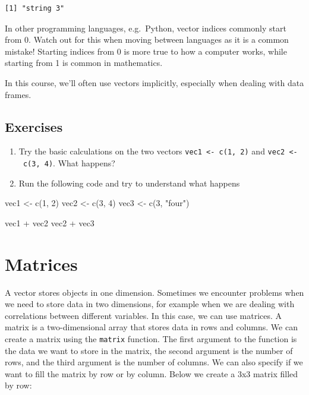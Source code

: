 \documentclass[
  letterpaper,
  DIV=11,
  numbers=noendperiod]{scrreprt}
\newenvironment{Shaded}{\begin{snugshade}}{\end{snugshade}}
\newcommand{\AttributeTok}[1]{\textcolor[rgb]{0.40,0.45,0.13}{#1}}
\newcommand{\DecValTok}[1]{\textcolor[rgb]{0.68,0.00,0.00}{#1}}
\newcommand{\FunctionTok}[1]{\textcolor[rgb]{0.28,0.35,0.67}{#1}}
\newcommand{\NormalTok}[1]{\textcolor[rgb]{0.00,0.23,0.31}{#1}}
\newcommand{\OtherTok}[1]{\textcolor[rgb]{0.00,0.23,0.31}{#1}}
\newcommand{\StringTok}[1]{\textcolor[rgb]{0.13,0.47,0.30}{#1}}
\providecommand{\tightlist}{%
  \setlength{\itemsep}{0pt}\setlength{\parskip}{0pt}}\usepackage{longtable,booktabs,array}
\begin{document}
\begin{verbatim}
[1] "string 3"
\end{verbatim}

{In other programming languages, e.g.~Python, vector indices commonly
start from 0. Watch out for this when moving between languages as it is
a common mistake! Starting indices from 0 is more true to how a computer
works, while starting from 1 is common in mathematics.}

In this course, we'll often use vectors implicitly, especially when
dealing with data frames.

\subsection{Exercises}\label{exercises-3}

\begin{enumerate}
\def\labelenumi{\arabic{enumi}.}
\tightlist
\item
  Try the basic calculations on the two vectors
  \texttt{vec1\ \textless{}-\ c(1,\ 2)} and
  \texttt{vec2\ \textless{}-\ c(3,\ 4)}. What happens?
\item
  Run the following code and try to understand what happens
\end{enumerate}

\begin{Shaded}
\begin{Highlighting}[]
\NormalTok{vec1 }\OtherTok{\textless{}{-}} \FunctionTok{c}\NormalTok{(}\DecValTok{1}\NormalTok{, }\DecValTok{2}\NormalTok{)}
\NormalTok{vec2 }\OtherTok{\textless{}{-}} \FunctionTok{c}\NormalTok{(}\DecValTok{3}\NormalTok{, }\DecValTok{4}\NormalTok{)}
\NormalTok{vec3 }\OtherTok{\textless{}{-}} \FunctionTok{c}\NormalTok{(}\DecValTok{3}\NormalTok{, }\StringTok{"four"}\NormalTok{)}\StringTok{\textasciigrave{}}

\AttributeTok{vec1 + vec2}
\AttributeTok{vec2 + vec3}
\end{Highlighting}
\end{Shaded}

\section{Matrices}\label{matrices}

A vector stores objects in one dimension. Sometimes we encounter
problems when we need to store data in two dimensions, for example when
we are dealing with correlations between different variables. In this
case, we can use matrices. A matrix is a two-dimensional array that
stores data in rows and columns. We can create a matrix using the
\texttt{matrix} function. The first argument to the function is the data
we want to store in the matrix, the second argument is the number of
rows, and the third argument is the number of columns. We can also
specify if we want to fill the matrix by row or by column. Below we
create a 3x3 matrix filled by row:
\end{document}
